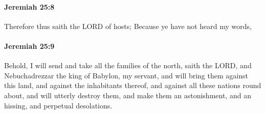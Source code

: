 		\paragraph{Jeremiah 25:8} %
			\label{JEREMIAH-25-8}

			Therefore thus saith the LORD of hosts; Because ye have not heard my words,


		\paragraph{Jeremiah 25:9} %
			\label{JEREMIAH-25-9}

			Behold, I will send and take all the families of the north, saith the LORD, and Nebuchadrezzar the king of Babylon, my servant, and will bring them against this land, and against the inhabitants thereof, and against all these nations round about, and will utterly destroy them, and make them an astonishment, and an hissing, and perpetual desolations.

